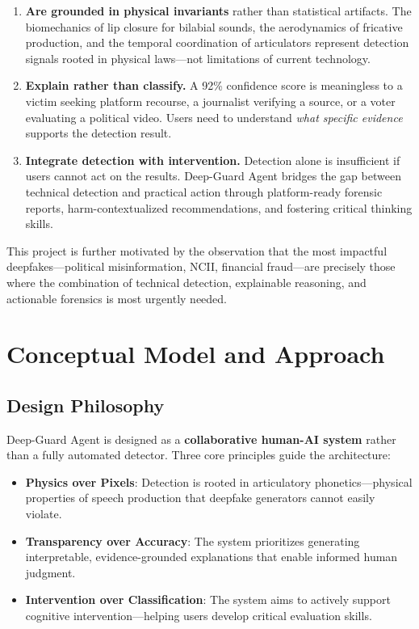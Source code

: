 \documentclass[11pt,a4paper]{article}
\begin{document}
\begin{enumerate}[leftmargin=2em]
    \item \textbf{Are grounded in physical invariants} rather than statistical artifacts. The biomechanics of lip closure for bilabial sounds, the aerodynamics of fricative production, and the temporal coordination of articulators represent detection signals rooted in physical laws---not limitations of current technology.

    \item \textbf{Explain rather than classify.} A 92\% confidence score is meaningless to a victim seeking platform recourse, a journalist verifying a source, or a voter evaluating a political video. Users need to understand \emph{what specific evidence} supports the detection result.

    \item \textbf{Integrate detection with intervention.} Detection alone is insufficient if users cannot act on the results. Deep-Guard Agent bridges the gap between technical detection and practical action through platform-ready forensic reports, harm-contextualized recommendations, and fostering critical thinking skills.
\end{enumerate}

This project is further motivated by the observation that the most impactful deepfakes---political misinformation, NCII, financial fraud---are precisely those where the combination of technical detection, explainable reasoning, and actionable forensics is most urgently needed.


\section{Conceptual Model and Approach}

\subsection{Design Philosophy}

Deep-Guard Agent is designed as a \textbf{collaborative human-AI system} rather than a fully automated detector. Three core principles guide the architecture:

\begin{itemize}[leftmargin=2em]
    \item \textbf{Physics over Pixels}: Detection is rooted in articulatory phonetics---physical properties of speech production that deepfake generators cannot easily violate.
    \item \textbf{Transparency over Accuracy}: The system prioritizes generating interpretable, evidence-grounded explanations that enable informed human judgment.
    \item \textbf{Intervention over Classification}: The system aims to actively support cognitive intervention---helping users develop critical evaluation skills.
\end{itemize}
\end{document}
